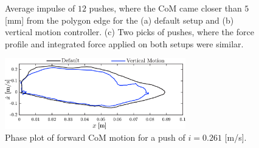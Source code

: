 \begin{figure}
\begin{subfigure}{0.32\textwidth}
  \caption{}
   \label{fig:imp3}
  \end{subfigure}
  \caption{Average impulse of $12$ pushes, where the \ac{CoM} came closer than $5$ [mm] from the polygon edge for the (a) default setup and (b) vertical motion controller. (c) Two picks of pushes, where the force profile and integrated force applied on both setups were similar. }
  \label{fig:impulsecompare}
\end{figure}

\begin{figure}
\centering
\includegraphics[width=0.7\textwidth]{STYLESTUFF/valcomparephaseHW.png}
\caption{Phase plot of forward \ac{CoM} motion for a push of $i=0.261$ [m/s].}
\label{fig:valcomparephaseHW}
\end{figure}
